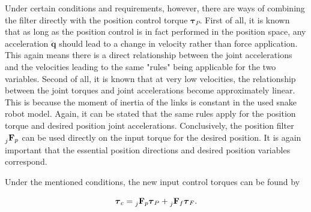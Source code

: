 Under certain conditions and requirements, however, there are ways of combining the filter directly with the position control torque $\boldsymbol{\tau}_P$. First of all, it is known that as long as the position control is in fact performed in the position space, any acceleration $\ddot{\mathbf{q}}$ should lead to a change in velocity rather than force application. This again means there is a direct relationship between the joint accelerations and the velocities leading to the same "rules" being applicable for the two variables. Second of all, it is known that at very low velocities, the relationship between the joint torques and joint accelerations become approximately linear. This is because the moment of inertia of the links is constant in the used snake robot model. Again, it can be stated that the same rules apply for the position torque and desired position joint accelerations. Conclusively, the position filter $\prescript{}{j}{\mathbf{F}}_{p}$ can be used directly on the input torque for the desired position. It is again important that the essential position directions and desired position variables correspond.

Under the mentioned conditions, the new input control torques can be found by

\begin{equation}
    \boldsymbol{\tau}_c = \prescript{}{j}{\mathbf{F}}_{p} \boldsymbol{\tau}_P + \prescript{}{j}{\mathbf{F}}_{f} \boldsymbol{\tau}_F.
\end{equation}
